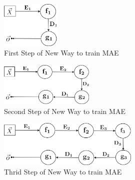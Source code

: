 \documentclass[draft,dvipsnames]{drexel-thesis}
\begin{document}
\begin{thesis}
\begin{figure}[t!]
    \centering
    \includegraphics[width=0.25\textwidth]{pictures/figures/train_new_MAE1.png}
    \caption{First Step of New Way to train MAE}
    \label{fig:train_NMAE1}
\end{figure}

\begin{figure}[t!]
    \centering
    \includegraphics[width=0.4\textwidth]{pictures/figures/train_new_MAE2.png}
    \caption{Second Step of New Way to train MAE}
    \label{fig:train_NMAE2}
\end{figure}

\begin{figure}[t!]
    \centering
    \includegraphics[width=0.6\textwidth]{pictures/figures/train_new_MAE3.png}
    \caption{Thrid Step of New Way to train MAE}
    \label{fig:train_NMAE3}
\end{figure}




\end{thesis}


\end{document}
